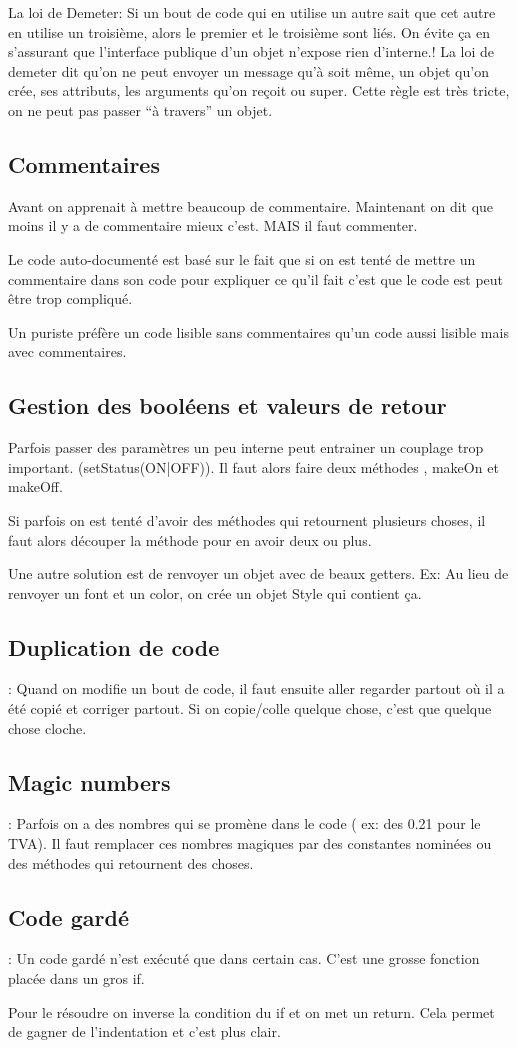 La loi de Demeter: Si un bout de code qui en utilise un autre sait que cet autre en utilise un troisième, alors le premier et le troisième sont liés. On évite ça en s’assurant que l’interface publique d’un objet n’expose rien d’interne.!
La loi de demeter dit qu’on ne peut envoyer un message qu’à soit même, un objet qu’on crée, ses attributs, les arguments qu’on reçoit ou super. Cette règle est très tricte, on ne peut pas passer “à travers” un objet.
\subsection{Commentaires}
Avant on apprenait à mettre beaucoup de commentaire. Maintenant on dit que moins il y a de commentaire mieux c’est. MAIS il faut commenter.

Le code auto-documenté est basé sur le fait que si on est tenté de mettre un commentaire dans son code pour expliquer ce qu’il fait c’est que le code est peut être trop compliqué.

Un puriste préfère un code lisible sans commentaires qu’un code aussi lisible mais avec commentaires.
\subsection{Gestion des booléens et valeurs de retour}
Parfois passer des paramètres un peu interne peut entrainer un couplage trop important. (setStatus(ON|OFF)). Il faut alors faire deux méthodes , makeOn et makeOff.

Si parfois on est tenté d’avoir des méthodes qui retournent plusieurs choses, il faut alors découper la méthode pour en avoir deux ou plus.

Une autre solution est de renvoyer un objet avec de beaux getters. Ex: Au lieu de renvoyer un font et un color, on crée un objet Style qui contient ça.
\subsection{Duplication de code}:
Quand on modifie un bout de code, il faut ensuite aller regarder partout où il a été copié et corriger partout. Si on copie/colle quelque chose, c’est que quelque chose cloche.
\subsection{Magic numbers}:
Parfois on a des nombres qui se promène dans le code ( ex: des 0.21 pour le TVA).
Il faut remplacer ces nombres magiques par des constantes nominées ou des méthodes qui retournent des choses.
\subsection{Code gardé}:
Un code gardé n’est exécuté que dans certain cas. C’est une grosse fonction placée dans un gros if.

Pour le résoudre on inverse la condition du if et on met un return.
Cela permet de gagner de l’indentation et c’est plus clair.